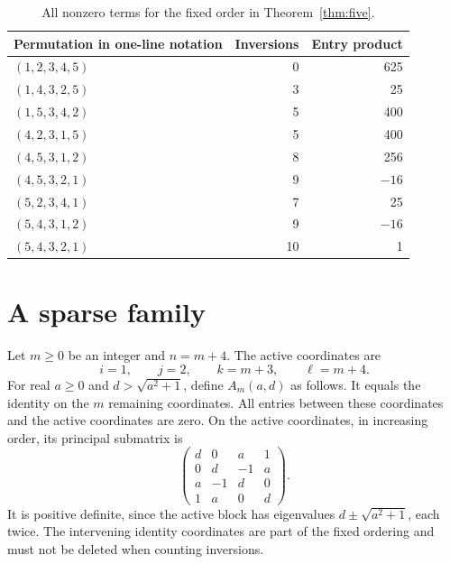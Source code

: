 \documentclass[11pt]{article}
\begin{document}
\begin{table}[htbp]
\centering
\begin{tabular}{@{}lrr@{}}
\toprule
Permutation in one-line notation & Inversions & Entry product\\
\midrule
$(1,2,3,4,5)$ &0&625\\
$(1,4,3,2,5)$ &3&25\\
$(1,5,3,4,2)$ &5&400\\
$(4,2,3,1,5)$ &5&400\\
$(4,5,3,1,2)$ &8&256\\
$(4,5,3,2,1)$ &9&$-16$\\
$(5,2,3,4,1)$ &7&25\\
$(5,4,3,1,2)$ &9&$-16$\\
$(5,4,3,2,1)$ &10&1\\
\bottomrule
\end{tabular}
\caption{All nonzero terms for the fixed order in Theorem~\ref{thm:five}.}
\label{tab:terms}
\end{table}

\section{A sparse family}
Let $m\ge0$ be an integer and $n=m+4$. The active coordinates are
\[
 i=1,\qquad j=2,\qquad k=m+3,\qquad \ell=m+4.
\]
For real $a\ge0$ and $d>\sqrt{a^2+1}$, define $A_m(a,d)$ as follows. It equals the identity on the $m$ remaining coordinates. All entries between these coordinates and the active coordinates are zero. On the active coordinates, in increasing order, its principal submatrix is
\begin{equation}\label{eq:core}
 \begin{pmatrix}
 d&0&a&1\\
 0&d&-1&a\\
 a&-1&d&0\\
 1&a&0&d
 \end{pmatrix}.
\end{equation}
It is positive definite, since the active block has eigenvalues $d\pm\sqrt{a^2+1}$, each twice. The intervening identity coordinates are part of the fixed ordering and must not be deleted when counting inversions.
\end{document}
